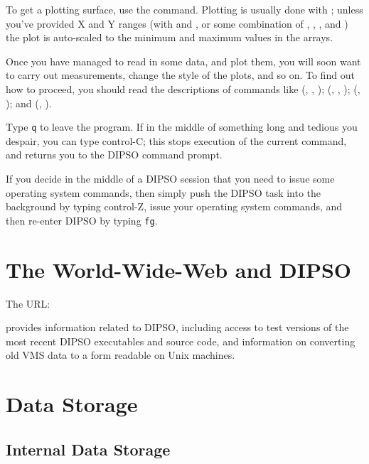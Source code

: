 To get a plotting surface, use the   command. Plotting is
usually done with ;  unless you've provided X and Y ranges
(with   and ,  or some combination of , 
,  ,  and )  the plot is auto-scaled to the
minimum and maximum values in the arrays.

Once you have managed to read in some data, and plot them, you will
soon want to carry out measurements, change the style of the plots,
and so on. To find out how to proceed, you should read the
descriptions of commands like (,  ,  ); 
(,  ,  );  (,  ); 
and (,  ). 

Type {\tt{q}}  to leave the program. If in the middle of something long and
tedious you despair, you can type control-C; this stops execution of the current
command, and returns you to the DIPSO command prompt.

If you decide in the middle of a DIPSO session that you need to issue some
operating system commands, then simply push the DIPSO task into the background
by typing control-Z,
issue your operating system commands, and then re-enter DIPSO by typing {\tt{fg}}. 

\section{The World-Wide-Web and DIPSO}
The URL:


provides information related to DIPSO, including access to test
versions of the most recent DIPSO executables and source code, and
information on converting old VMS data to a form readable on Unix machines.

\section {Data Storage}

\subsection{Internal Data Storage}

